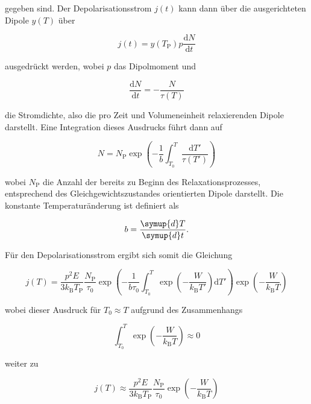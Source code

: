 gegeben sind. Der Depolarisationsstrom $j(t)$ kann dann über die ausgerichteten 
Dipole $y(T)$ über 

\begin{equation*}
    j(t) = y(T_{\mathrm{P}}) p \frac{\mathrm{d}N}{\mathrm{d}t}
\end{equation*}

ausgedrückt werden, wobei $p$ das Dipolmoment und 

\begin{equation*}
    \frac{\mathrm{d}N}{\mathrm{d}t} = -\frac{N}{\tau(T)}
\end{equation*}

die Stromdichte, also die pro Zeit und Volumeneinheit relaxierenden Dipole darstellt.
Eine Integration dieses Ausdrucks führt dann auf 

\begin{equation*}
    N = N_{\mathrm{P}} \exp{ \left( - \frac{ 1 }{ b } \int_{T_0}^T \frac{ \mathrm{d}T' }{ \tau(T') } \right )}
\end{equation*}

wobei $N_{\text{P}}$ die Anzahl der bereits zu Beginn des Relaxationsprozesses,
entsprechend des Gleichgewichtszustandes orientierten Dipole darstellt.
Die konstante Temperaturänderung ist definiert als

\begin{equation*}
    b = \frac{\symup{d}T}{\symup{d}t}.
\end{equation*}

Für den Depolarisationsstrom ergibt sich somit die Gleichung 

\begin{equation*}
    j(T) = \frac{ p^{2} E }{ 3 k_{\mathrm{B}} T_{\mathrm{P}} } \frac{ N_{\mathrm{P}} }{ \tau_{\text{0}} } \exp{ \left( - \frac{ 1 }{ b \tau_{\text{0}} } \int_{T_{\text{0}}}^T \exp{ \left( - \frac{ W }{ k_{\mathrm{B}} T' } \right) \mathrm{d}T' } \right) } \exp{ \left( -\frac{ W }{ k_{\mathrm{B}} T } \right) } 
\end{equation*}

wobei dieser Ausdruck für $T_{\text{0}} \approx T$ aufgrund des 
Zusammenhangs

\begin{equation*}
    \int_{T_{\text{0}}}^T \exp{ \left( - \frac{ W }{ k_{\mathrm{B}} T } \right )} \approx 0  
\end{equation*}

weiter zu 

\begin{equation}
    j(T) \approx \frac{ p^{2} E }{ 3 k_{\mathrm{B}} T_{\mathrm{P} }} \frac{ N_{\mathrm{P}} }{ \tau_{\text{0}} } \exp{ \left( - \frac{ W }{ k_{\mathrm{B}} T} \right ) }
    \label{eq2}
\end{equation}

